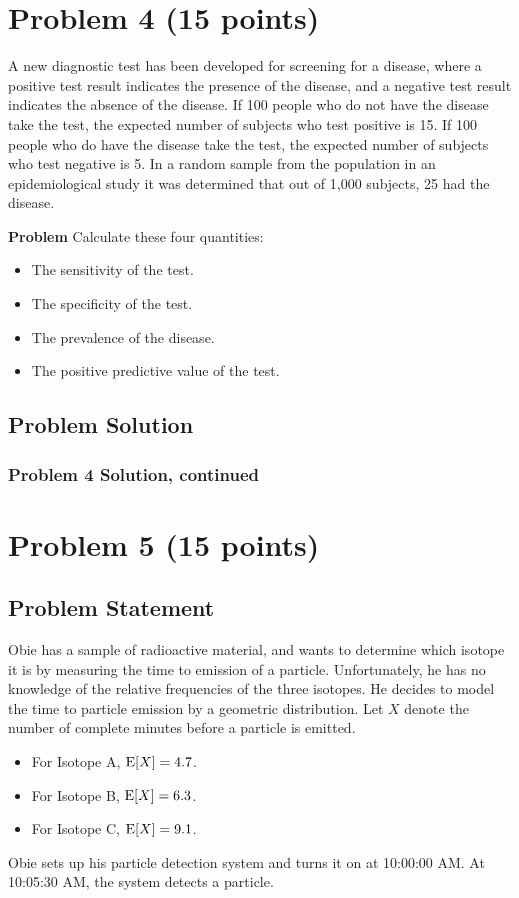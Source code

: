 \documentclass[12pt]{article}
\theoremstyle{definition}
\begin{document}
\newpage
\section*{Problem 4 (15 points)}

A new diagnostic test has been developed for screening for a disease, where a positive test result indicates the presence of the disease, and a negative test result indicates the absence of the disease. If 100 people who do not have the disease take the test, the expected number of subjects who test positive is 15. If 100 people who do have the disease take the test, the expected number of subjects who test negative is 5. In a random sample from the population in an epidemiological study it was determined that out of 1,000 subjects, 25 had the disease.

\bigskip
\noindent
{\bf Problem} Calculate these four quantities:
\begin{itemize}
	\item The sensitivity of the test.
	\item The specificity of the test.
	\item The prevalence of the disease.
	\item The positive predictive value of the test.
\end{itemize}

\subsection*{Problem Solution}


	
\newpage
\subsubsection*{Problem 4 Solution, continued}


\newpage
\section*{Problem 5 (15 points)}

\subsection*{Problem Statement}

Obie has a sample of radioactive material, and wants to determine which isotope it is by measuring the time to emission of a particle. Unfortunately, he has no knowledge of the relative frequencies of the three isotopes. He decides to model the time to particle emission by a geometric distribution. Let $X$ denote the number of complete minutes before a particle is emitted.
\begin{itemize}
	\item For Isotope A, $\hbox{E}[X] = 4.7$.
	\item For Isotope B, $\hbox{E}[X] = 6.3$.
	\item For Isotope C, $\hbox{E}[X] = 9.1$.
\end{itemize}
Obie sets up his particle detection system and turns it on at 10:00:00 AM. At 10:05:30 AM, the system detects a particle.
\end{document}
